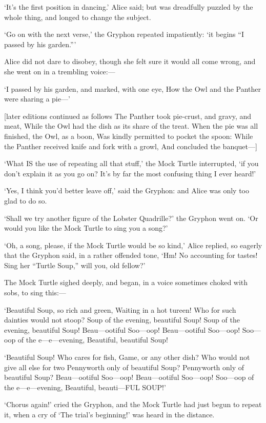 \documentclass[12pt]{book}
\begin{document}
\begin{Parallel}[p]{}{}
{‘It’s the first position in dancing.’ Alice said; but was dreadfully puzzled by the whole thing, and longed to change the subject.

‘Go on with the next verse,’ the Gryphon repeated impatiently: ‘it begins “I passed by his garden.”’

Alice did not dare to disobey, though she felt sure it would all come wrong, and she went on in a trembling voice:—

  ‘I passed by his garden, and marked, with one eye,
  How the Owl and the Panther were sharing a pie—’

    [later editions continued as follows
  The Panther took pie-crust, and gravy, and meat,
  While the Owl had the dish as its share of the treat.
  When the pie was all finished, the Owl, as a boon,
  Was kindly permitted to pocket the spoon:
  While the Panther received knife and fork with a growl,
  And concluded the banquet—]

‘What IS the use of repeating all that stuff,’ the Mock Turtle interrupted, ‘if you don’t explain it as you go on? It’s by far the most confusing thing I ever heard!’

‘Yes, I think you’d better leave off,’ said the Gryphon: and Alice was only too glad to do so.

‘Shall we try another figure of the Lobster Quadrille?’ the Gryphon went on. ‘Or would you like the Mock Turtle to sing you a song?’

‘Oh, a song, please, if the Mock Turtle would be so kind,’ Alice replied, so eagerly that the Gryphon said, in a rather offended tone, ‘Hm! No accounting for tastes! Sing her “Turtle Soup,” will you, old fellow?’

The Mock Turtle sighed deeply, and began, in a voice sometimes choked with sobs, to sing this:—

   ‘Beautiful Soup, so rich and green,
   Waiting in a hot tureen!
   Who for such dainties would not stoop?
   Soup of the evening, beautiful Soup!
   Soup of the evening, beautiful Soup!
     Beau—ootiful Soo—oop!
     Beau—ootiful Soo—oop!
   Soo—oop of the e—e—evening,
     Beautiful, beautiful Soup!

   ‘Beautiful Soup! Who cares for fish,
   Game, or any other dish?
   Who would not give all else for two
   Pennyworth only of beautiful Soup?
   Pennyworth only of beautiful Soup?
     Beau—ootiful Soo—oop!
     Beau—ootiful Soo—oop!
   Soo—oop of the e—e—evening,
     Beautiful, beauti—FUL SOUP!’

‘Chorus again!’ cried the Gryphon, and the Mock Turtle had just begun to repeat it, when a cry of ‘The trial’s beginning!’ was heard in the distance.

}
\end{Parallel}
\end{document}

